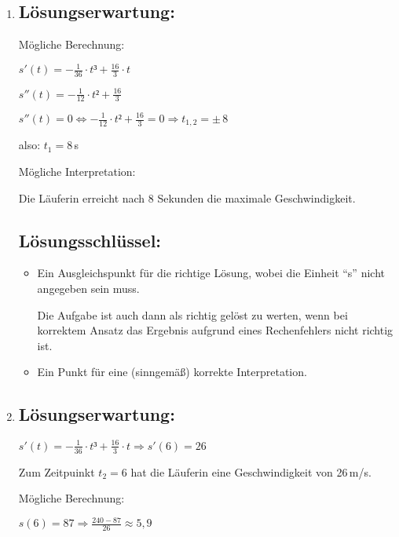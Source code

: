\begin{langesbeispiel}
{\begin{enumerate}
\begin{itemize}
		Die Aufgabe ist auch dann als richtig gelöst zu werten, wenn bei korrektem Ansatz das Ergebnis aufgrund eines Rechenfehlers nicht richtig ist.
	\end{itemize}
	
	\item \subsection{Lösungserwartung:}
			
	Mögliche Berechnung:
	
	$s'(t)=-\frac{1}{36}\cdot t³+\frac{16}{3}\cdot t$
	
	$s''(t)=-\frac{1}{12}\cdot t²+\frac{16}{3}$
	
	$s''(t)=0 \Leftrightarrow -\frac{1}{12}\cdot t²+\frac{16}{3}=0 \Rightarrow t_{1,2}=\pm\,8$
	
	also: $t_1=8$\,s\leer
	
	Mögliche Interpretation:
	
	Die Läuferin erreicht nach 8 Sekunden die maximale Geschwindigkeit.

	\subsection{Lösungsschlüssel:}
	
\begin{itemize}
	\item Ein Ausgleichspunkt für die richtige Lösung, wobei die Einheit "`s"' nicht angegeben sein muss.  
	
	Die Aufgabe ist auch dann als richtig gelöst zu werten, wenn bei korrektem Ansatz das Ergebnis aufgrund eines Rechenfehlers nicht richtig ist. 
	\item Ein Punkt für eine (sinngemäß) korrekte Interpretation.
\end{itemize}

\item \subsection{Lösungserwartung:}
			
$s'(t)=-\frac{1}{36}\cdot t³+\frac{16}{3}\cdot t \Rightarrow s'(6)=26$

Zum Zeitpuinkt $t_2=6$ hat die Läuferin eine Geschwindigkeit von 26\,m/s.\leer

Mögliche Berechnung:

$s(6)=87 \Rightarrow \frac{240-87}{26}\approx 5,9$


\end{enumerate}}
\end{langesbeispiel}
